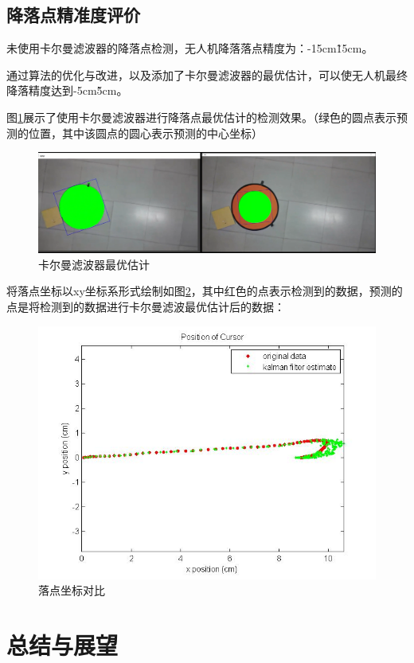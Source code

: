 \section{降落点精准度评价}

未使用卡尔曼滤波器的降落点检测，无人机降落落点精度为：-15cm\~15cm。

通过算法的优化与改进，以及添加了卡尔曼滤波器的最优估计，可以使无人机最终降落精度达到-5cm\~5cm。

图\ref{Fig:img19}展示了使用卡尔曼滤波器进行降落点最优估计的检测效果。（绿色的圆点表示预测的位置，其中该圆点的圆心表示预测的中心坐标）

\begin{figure}[ht]
  \centering
  \includegraphics[width=0.8\linewidth]{./Figure/Kalman_Prediction.png}
  \caption{卡尔曼滤波器最优估计}\label{Fig:img19}
\end{figure}

将落点坐标以xy坐标系形式绘制如图\ref{Fig:img20}，其中红色的点表示检测到的数据，预测的点是将检测到的数据进行卡尔曼滤波最优估计后的数据：

\begin{figure}[ht]
  \centering
  \includegraphics[width=0.8\linewidth]{./Figure/Landingpad_Kalman_Prediction.jpg}
  \caption{落点坐标对比}\label{Fig:img20}
\end{figure}

\chapter{总结与展望}

